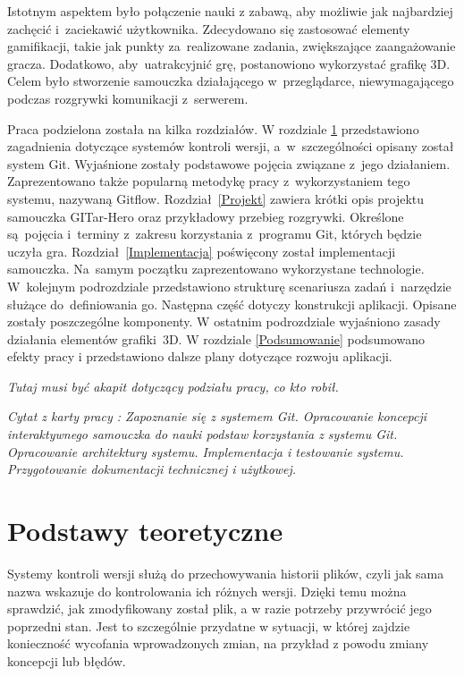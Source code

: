 \documentclass[12pt,a4paper,polish,thesis]{dcsbook}
\begin{document}
	Istotnym aspektem było połączenie nauki z zabawą, aby możliwie jak najbardziej zachęcić i~zaciekawić użytkownika. Zdecydowano się zastosować elementy gamifikacji, takie jak punkty za~realizowane zadania, zwiększające zaangażowanie gracza. Dodatkowo, aby~uatrakcyjnić grę, postanowiono wykorzystać grafikę 3D. Celem było stworzenie samouczka działającego w~przeglądarce, niewymagającego podczas rozgrywki komunikacji z~serwerem.

	Praca podzielona została na kilka rozdziałów. W rozdziale \ref{Teoria} przedstawiono zagadnienia dotyczące systemów kontroli wersji, a~w~szczególności opisany został system Git. Wyjaśnione zostały podstawowe pojęcia związane z~jego działaniem. Zaprezentowano także popularną metodykę pracy z~wykorzystaniem tego systemu, nazywaną Gitflow. Rozdział~\ref{Projekt} zawiera krótki opis projektu samouczka GITar-Hero oraz przykładowy przebieg rozgrywki. Określone są~pojęcia i~terminy z~zakresu korzystania z~programu Git, których będzie uczyła gra. Rozdział~\ref{Implementacja} poświęcony został implementacji samouczka. Na~samym początku zaprezentowano wykorzystane technologie. W~kolejnym podrozdziale przedstawiono strukturę scenariusza zadań i~narzędzie służące do~definiowania go. Następna część dotyczy konstrukcji aplikacji. Opisane zostały poszczególne komponenty. W ostatnim podrozdziale wyjaśniono zasady działania elementów grafiki~3D. W rozdziale \ref{Podsumowanie} podsumowano efekty pracy i przedstawiono dalsze plany dotyczące rozwoju aplikacji.

	\textit{Tutaj musi być akapit dotyczący podziału pracy, co kto robił.}
	
	\textit{Cytat z karty pracy : Zapoznanie się z systemem Git. Opracowanie koncepcji interaktywnego samouczka do nauki podstaw korzystania z systemu Git.  Opracowanie architektury systemu. Implementacja i testowanie systemu. Przygotowanie dokumentacji technicznej i użytkowej.}

	\chapter{Podstawy teoretyczne} \label{Teoria}

	Systemy kontroli wersji służą do przechowywania historii plików, czyli jak sama nazwa wskazuje do kontrolowania ich różnych wersji. Dzięki temu można sprawdzić, jak zmodyfikowany został plik, a w razie potrzeby przywrócić jego poprzedni stan. Jest to szczególnie przydatne w sytuacji, w której zajdzie konieczność wycofania wprowadzonych zmian, na przykład z powodu zmiany koncepcji lub błędów.
\end{document}
